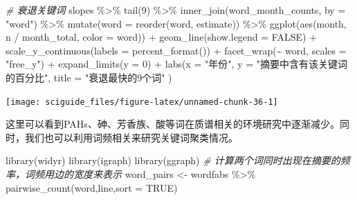 \documentclass[]{tufte-book}
\newenvironment{Shaded}{}{}
\newcommand{\AttributeTok}[1]{\textcolor[rgb]{0.49,0.56,0.16}{#1}}
\newcommand{\CommentTok}[1]{\textcolor[rgb]{0.38,0.63,0.69}{\textit{#1}}}
\newcommand{\ConstantTok}[1]{\textcolor[rgb]{0.53,0.00,0.00}{#1}}
\newcommand{\DecValTok}[1]{\textcolor[rgb]{0.25,0.63,0.44}{#1}}
\newcommand{\FunctionTok}[1]{\textcolor[rgb]{0.02,0.16,0.49}{#1}}
\newcommand{\NormalTok}[1]{#1}
\newcommand{\OtherTok}[1]{\textcolor[rgb]{0.00,0.44,0.13}{#1}}
\newcommand{\SpecialCharTok}[1]{\textcolor[rgb]{0.25,0.44,0.63}{#1}}
\newcommand{\StringTok}[1]{\textcolor[rgb]{0.25,0.44,0.63}{#1}}
\begin{document}
\begin{Shaded}
\begin{Highlighting}[]
\CommentTok{\# 衰退关键词}
\NormalTok{slopes }\SpecialCharTok{\%\textgreater{}\%}
  \FunctionTok{tail}\NormalTok{(}\DecValTok{9}\NormalTok{) }\SpecialCharTok{\%\textgreater{}\%}
  \FunctionTok{inner\_join}\NormalTok{(word\_month\_counts, }\AttributeTok{by =} \StringTok{"word"}\NormalTok{) }\SpecialCharTok{\%\textgreater{}\%}
  \FunctionTok{mutate}\NormalTok{(}\AttributeTok{word =} \FunctionTok{reorder}\NormalTok{(word, estimate)) }\SpecialCharTok{\%\textgreater{}\%}
  \FunctionTok{ggplot}\NormalTok{(}\FunctionTok{aes}\NormalTok{(month, n }\SpecialCharTok{/}\NormalTok{ month\_total, }\AttributeTok{color =}\NormalTok{ word)) }\SpecialCharTok{+}
  \FunctionTok{geom\_line}\NormalTok{(}\AttributeTok{show.legend =} \ConstantTok{FALSE}\NormalTok{) }\SpecialCharTok{+}
  \FunctionTok{scale\_y\_continuous}\NormalTok{(}\AttributeTok{labels =} \FunctionTok{percent\_format}\NormalTok{()) }\SpecialCharTok{+}
  \FunctionTok{facet\_wrap}\NormalTok{(}\SpecialCharTok{\textasciitilde{}}\NormalTok{ word, }\AttributeTok{scales =} \StringTok{"free\_y"}\NormalTok{) }\SpecialCharTok{+}
  \FunctionTok{expand\_limits}\NormalTok{(}\AttributeTok{y =} \DecValTok{0}\NormalTok{) }\SpecialCharTok{+}
  \FunctionTok{labs}\NormalTok{(}\AttributeTok{x =} \StringTok{"年份"}\NormalTok{,}
       \AttributeTok{y =} \StringTok{"摘要中含有该关键词的百分比"}\NormalTok{,}
       \AttributeTok{title =} \StringTok{"衰退最快的9个词"}
\NormalTok{              )}
\end{Highlighting}
\end{Shaded}

\texttt{[image: sciguide\_files/figure-latex/unnamed-chunk-36-1]}

这里可以看到PAHs、砷、芳香族、酸等词在质谱相关的环境研究中逐渐减少。同时，我们也可以利用词频相关来研究关键词聚类情况。

\begin{Shaded}
\begin{Highlighting}[]
\FunctionTok{library}\NormalTok{(widyr)}
\FunctionTok{library}\NormalTok{(igraph)}
\FunctionTok{library}\NormalTok{(ggraph)}
\CommentTok{\# 计算两个词同时出现在摘要的频率，词频用边的宽度来表示}
\NormalTok{word\_pairs }\OtherTok{\textless{}{-}}\NormalTok{ wordfabs }\SpecialCharTok{\%\textgreater{}\%}
        \FunctionTok{pairwise\_count}\NormalTok{(word,line,}\AttributeTok{sort =} \ConstantTok{TRUE}\NormalTok{)}
\end{Highlighting}
\end{Shaded}
\end{document}
